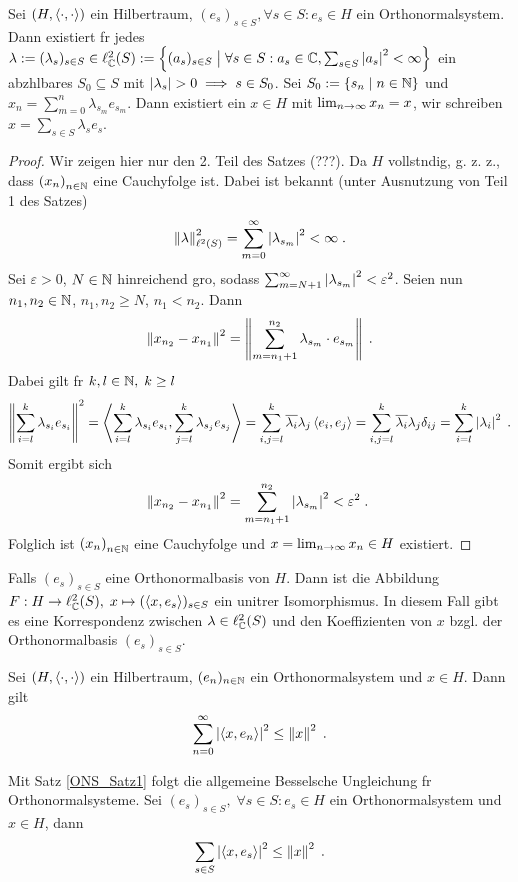 \begin{theorem}
	Sei \((H, \ip{\cdot, \cdot})\) ein Hilbertraum, \((e_s)_{s\in S}, \forall s\in S: e_s \in H\) ein Orthonormalsystem. Dann existiert f\us r jedes \(\lambda := (\lambda_s)_{s\in S} \in \ell_\C^2(S) :=\set{(a_s)_{s\in S} \;\big\vert\; \forall s \in S: a_s \in \C, \sum_{s\in S} \ab{a_s}^2 < \infty}\) ein abz\as hlbares \(S_0 \subseteq S\) mit \(\ab{\lambda_s} > 0\implies s \in S_0\). Sei \(S_0 := \{s_n \;\vert\; n \in \N\}\) und \(x_n = \sum_{m=0}^n \lambda_{s_m} e_{s_m}\). Dann existiert ein \(x\in H\) mit \(\li xn = x\), wir schreiben \(x = \sum_{s\in S} \lambda_s e_s\).
	\label{ONS_Satz1}
\end{theorem}
\begin{proof}
	Wir zeigen hier nur den 2. Teil des Satzes (???). Da $H$ vollst\as ndig, g. z. z., dass \(\seq xn\) eine Cauchyfolge ist. Dabei ist bekannt (unter Ausnutzung von Teil 1 des Satzes)
	\[\normn{\lambda}{\ell^2(S)}^2 = \sum_{m= 0}^\infty \ab{\lambda_{s_m}}^2 < \infty\;. \]
	Sei \(\varepsilon > 0\), \(N \in \N\) hinreichend gro\s{}, sodass \(\sum_{m=N+1}^\infty \ab{\lambda_{s_m}}^2 < \varepsilon^2\). Seien nun \(n_1, n_2 \in \N\), \(n_1, n_2 \geq N\), \(n_1< n_2\). Dann
	\[\norm{x_{n_2} - x_{n_1}}^2 = \norm{\sum_{m=n_1+1}^{n_2} \lambda_{s_m}\cdot e_{s_m}}\;.\]
	Dabei gilt f\us r \(k, l\in \N, \; k \geq l\)
	\[\norm{\sum_{i=l}^k \lambda_{s_i} e_{s_i}}^2= \ip{\sum_{i=l}^k \lambda_{s_i} e_{s_i}, \sum_{j=l}^k \lambda_{s_j} e_{s_j}} = \sum_{i,j=l}^k \overline{\lambda_i}\lambda_j \ip{e_i, e_j} = \sum_{i,j=l}^k \overline{\lambda_i}\lambda_j  \delta_{ij} = \sum_{i=l}^k \ab{\lambda_i}^2\;.\]
	Somit  ergibt sich 
	\[\norm{x_{n_2} - x_{n_1}}^2 = \sum_{m=n_1+1}^{n_2} \ab{\lambda_{s_m}}^2 < \varepsilon^2 \;.\ \]
	Folglich ist \(\seq xn\) eine Cauchyfolge und \(x = \li xn \in H\) existiert.
\end{proof}
\begin{rem}[Motivation]
	Falls \((e_s)_{s\in S}\) eine Orthonormalbasis von $H$. Dann ist die Abbildung \(F:H \to \ell^2_\C(S), \; x \mapsto (\ip{x, e_s})_{s\in S}\) ein unit\as rer Isomorphismus. In diesem Fall gibt es eine Korrespondenz zwischen \(\lambda \in \ell^2_\C(S)\) und den Koeffizienten von $x$ bzgl. der Orthonormalbasis \((e_s)_{s\in S}\). 
\end{rem}

\begin{lemma}
	Sei \((H,\ip{\cdot, \cdot})\) ein Hilbertraum, \((e_n)_{n\in\N}\) ein Orthonormalsystem und \(x\in H\). Dann gilt
	\[\ser{\ab{\ip{x, e_n}}}{n}^2 \leq \norm{x}^2\;.\]
	\label{Bessel_Ungleichung}
\end{lemma}
\begin{rem}
	Mit Satz \ref{ONS_Satz1} folgt die allgemeine Besselsche Ungleichung f\us r Orthonormalsysteme. Sei \((e_s)_{s\in S}, \;\forall s \in S: e_s \in H\) ein Orthonormalsystem und \(x\in H\), dann 
	\[\sum_{s\in S} \ab{\ip{x, e_s}}^2 \leq \norm{x}^2\;.\]
\end{rem}

